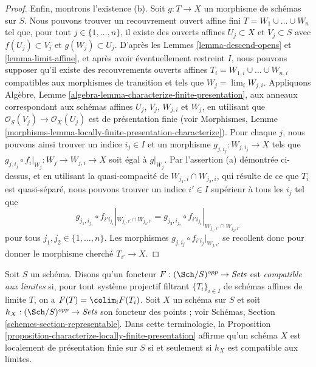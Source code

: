 \begin{proof}
\medskip\noindent
Enfin, montrons l'existence (b). Soit $g : T \to X$ un morphisme de schémas
sur $S$. Nous pouvons trouver un recouvrement ouvert affine fini
$T = W_1 \cup \ldots \cup W_n$ tel que, pour tout
$j \in \{1, \ldots, n\}$, il existe des ouverts affines $U_j \subset X$ et
$V_j \subset S$ avec $f(U_j) \subset V_j$ et $g(W_j) \subset U_j$.
D'après les Lemmes \ref{lemma-descend-opens} et \ref{lemma-limit-affine}, et
après avoir éventuellement restreint $I$, nous pouvons supposer qu'il existe
des recouvrements ouverts affines
$T_i = W_{1, i} \cup \ldots \cup W_{n, i}$ compatibles aux morphismes de
transition et tels que $W_j = \lim_i W_{j, i}$. Appliquons Algèbre,
Lemme \ref{algebra-lemma-characterize-finite-presentation}, aux anneaux
correspondant aux schémas affines $U_j$, $V_j$, $W_{j, i}$ et $W_j$, en
utilisant que $\mathcal{O}_S(V_j) \to \mathcal{O}_X(U_j)$ est de présentation
finie (voir Morphismes,
Lemme \ref{morphisms-lemma-locally-finite-presentation-characterize}). Pour
chaque $j$, nous pouvons ainsi trouver un indice $i_j \in I$ et un morphisme
$g_{j, i_j} : W_{j, i_j} \to X$ tels que
$g_{j, i_j} \circ f_i|_{W_j} : W_j \to W_{j, i} \to X$ soit égal à
$g|_{W_j}$. Par l'assertion (a) démontrée ci-dessus, et en utilisant la
quasi-compacité de $W_{j_1, i} \cap W_{j_2, i}$, qui résulte de ce que $T_i$
est quasi-séparé, nous pouvons trouver un indice $i' \in I$ supérieur à tous
les $i_j$ tel que
$$
g_{j_1, i_{j_1}} \circ f_{i'i_{j_1}}|_{W_{j_1, i'} \cap W_{j_2, i'}} =
g_{j_2, i_{j_2}} \circ f_{i'i_{j_2}}|_{W_{j_1, i'} \cap W_{j_2, i'}}
$$
pour tous $j_1, j_2 \in \{1, \ldots, n\}$. Les morphismes
$g_{j, i_j} \circ f_{i'i_j}|_{W_{j, i'}}$ se recollent donc pour donner le
morphisme cherché $T_{i'} \to X$.
\end{proof}

\begin{remark}
\label{remark-limit-preserving}
Soit $S$ un schéma. Disons qu'un foncteur
$F : (\Sch/S)^{opp} \to \textit{Sets}$ est
{\it compatible aux limites} si, pour tout système projectif filtrant
$\{T_i\}_{i \in I}$ de schémas affines de limite $T$, on a
$F(T) = \colim_i F(T_i)$. Soit $X$ un schéma sur $S$ et soit
$h_X : (\Sch/S)^{opp} \to \textit{Sets}$ son foncteur des points ; voir
Schémas, Section \ref{schemes-section-representable}. Dans cette
terminologie, la
Proposition \ref{proposition-characterize-locally-finite-presentation}
affirme qu'un schéma $X$ est localement de présentation finie sur $S$ si et
seulement si $h_X$ est compatible aux limites.
\end{remark}

